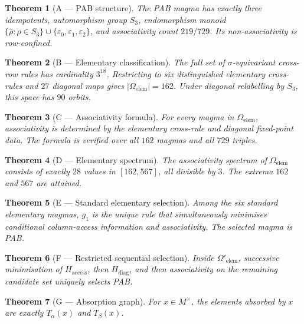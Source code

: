 \documentclass[11pt]{article}
\newtheorem*{theoremstar}{Theorem}
\begin{document}
\begin{theoremstar}[A --- PAB structure]
The PAB magma has exactly three idempotents,
automorphism group \(S_3\), endomorphism monoid
\(\{\widehat\rho:\rho\in S_3\}\cup\{\varepsilon_0,\varepsilon_1,\varepsilon_2\}\), and associativity count
\(219/729\). Its non-associativity is row-confined.

\end{theoremstar}
\begin{theoremstar}[B --- Elementary classification]
The full set of \(\sigma\)-equivariant
cross-row rules has cardinality \(3^{18}\). Restricting to six distinguished
elementary cross-rules and \(27\) diagonal maps gives
\(|\Omega_{\mathrm{elem}}|=162\). Under diagonal relabelling by \(S_3\), this space
has \(90\) orbits.

\end{theoremstar}
\begin{theoremstar}[C --- Associativity formula]
For every magma in
\(\Omega_{\mathrm{elem}}\), associativity is determined by the elementary
cross-rule and diagonal fixed-point data. The formula is verified over all
\(162\) magmas and all \(729\) triples.

\end{theoremstar}
\begin{theoremstar}[D --- Elementary spectrum]
The associativity spectrum of
\(\Omega_{\mathrm{elem}}\) consists of exactly \(28\) values in \([162,567]\), all
divisible by \(3\). The extrema \(162\) and \(567\) are attained.

\end{theoremstar}
\begin{theoremstar}[E --- Standard elementary selection]
Among the six standard
elementary magmas, \(g_1\) is the unique rule that simultaneously minimises
conditional column-access information and associativity. The selected magma is
PAB.

\end{theoremstar}
\begin{theoremstar}[F --- Restricted sequential selection]
Inside \(\Omega'_{\mathrm{elem}}\),
successive minimisation of \(H_{\mathrm{access}}\), then \(H_{\mathrm{diag}}\), and then
associativity on the remaining candidate set uniquely selects PAB.

\end{theoremstar}
\begin{theoremstar}[G --- Absorption graph]
For \(x\in M^\times\), the elements absorbed by
\(x\) are exactly \(T_\alpha(x)\) and \(T_\beta(x)\).

\end{theoremstar}
\end{document}
